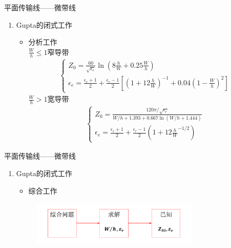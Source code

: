 \begin{frame}{平面传输线——微带线}
    \begin{enumerate}
        \resume
        \item Gupta的闭式工作\\
              \begin{itemize}
                  \item 分析工作\\
                  $\frac{W}{h}\leqslant 1 \text{窄导带}$
                  \begin{align*}
                    \begin{cases}
                        Z_0=\frac{60}{\sqrt{\epsilon_e}}\ln\left(8\frac{h}{W}+0.25\frac{W}{h}\right)\\
                        \epsilon_e=\frac{\epsilon_r+1}{2}+\frac{\epsilon_r-1}{2}\left[\left(1+12\frac{h}{W}\right)^{-1}+0.04\left(1-\frac{W}{h}\right)^2\right]
                    \end{cases}
                  \end{align*}
                  $\frac{W}{h}>1 \text{宽导带}$
                  \begin{align*}
                    \begin{cases}
                        Z_0=\frac{120\pi/\sqrt{\epsilon_r}}{W/h+1.393+0.667\ln(W/h+1.444)}\\
                        \epsilon_e=\frac{\epsilon_r+1}{2}+\frac{\epsilon_r-1}{2}\left(1+12\frac{h}{W}^{-1/2}\right)
                    \end{cases}
                  \end{align*}
              \end{itemize}
    \end{enumerate}
\end{frame}

\begin{frame}{平面传输线——微带线}
    \begin{enumerate}
        \resume
        \item Gupta的闭式工作\\
        \begin{itemize}
            \item 综合工作
        \end{itemize}
        \begin{figure}
            \includegraphics[width=8cm]{Cha6//fig6-45.pdf}
        \end{figure}
    \end{enumerate}
\end{frame}

